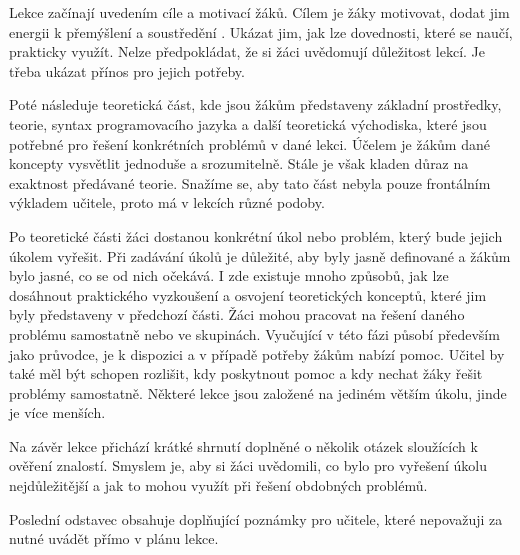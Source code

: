 \documentclass[
  digital,     %
  oneside,     %
  nosansbold,  %
  colorbold, %
  lof,         %
  nolot,         %
]{fithesis4}
\begin{document}

Lekce začínají uvedením cíle a motivací žáků. Cílem je žáky motivovat, dodat jim energii k přemýšlení a soustředění \cite{Filgona20}. Ukázat jim, jak lze dovednosti, které se naučí, prakticky využít. Nelze předpokládat, že si žáci uvědomují důležitost lekcí. Je třeba ukázat přínos pro jejich potřeby.

Poté následuje teoretická část, kde jsou žákům představeny základní prostředky, teorie, syntax programovacího jazyka a další teoretická východiska, které jsou potřebné pro řešení konkrétních problémů v dané lekci. Účelem je žákům dané koncepty vysvětlit jednoduše a srozumitelně. Stále je však kladen důraz na exaktnost předávané teorie. Snažíme se, aby tato část nebyla pouze frontálním výkladem učitele, proto má v lekcích různé podoby. %

Po teoretické části žáci dostanou konkrétní úkol nebo problém, který bude jejich úkolem vyřešit. Při zadávání úkolů je důležité, aby byly jasně definované a žákům bylo jasné, co se od nich očekává.  I zde existuje mnoho způsobů, jak lze dosáhnout praktického vyzkoušení a osvojení teoretických konceptů, které jim byly představeny v předchozí části. Žáci mohou pracovat na řešení daného problému samostatně nebo ve skupinách. Vyučující v této fázi působí především jako průvodce, je k dispozici a v případě potřeby žákům nabízí pomoc. Učitel by také měl být schopen rozlišit, kdy poskytnout pomoc a kdy nechat žáky řešit problémy samostatně. Některé lekce jsou založené na jediném větším úkolu, jinde je více menších.

Na závěr lekce přichází krátké shrnutí doplněné o několik otázek sloužících k ověření znalostí. Smyslem je, aby si žáci uvědomili, co bylo pro vyřešení úkolu nejdůležitější a jak to mohou využít při řešení obdobných problémů.

Poslední odstavec obsahuje doplňující poznámky pro učitele, které nepovažuji za nutné uvádět přímo v plánu lekce.
\end{document}
